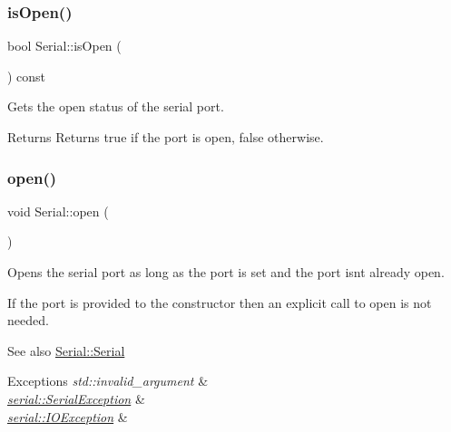 \subsubsection{\texorpdfstring{is\+Open()}{isOpen()}}
{\footnotesize\ttfamily bool Serial\+::is\+Open (\begin{DoxyParamCaption}{ }\end{DoxyParamCaption}) const}

Gets the open status of the serial port.

\begin{DoxyReturn}{Returns}
Returns true if the port is open, false otherwise. 
\end{DoxyReturn}
\mbox{\label{classserial_1_1_serial_af3644ed1a9d899b70e9d63bb9b808d62}} 
\subsubsection{\texorpdfstring{open()}{open()}}
{\footnotesize\ttfamily void Serial\+::open (\begin{DoxyParamCaption}{ }\end{DoxyParamCaption})}

Opens the serial port as long as the port is set and the port isn\textquotesingle{}t already open.

If the port is provided to the constructor then an explicit call to open is not needed.

\begin{DoxySeeAlso}{See also}
\mbox{\hyperlink{classserial_1_1_serial_aecbc4cc1723143805ae5a4aa79ba9332}{Serial\+::\+Serial}}
\end{DoxySeeAlso}

\begin{DoxyExceptions}{Exceptions}
{\em std\+::invalid\+\_\+argument} & \\
\hline
{\em \mbox{\hyperlink{classserial_1_1_serial_exception}{serial\+::\+Serial\+Exception}}} & \\
\hline
{\em \mbox{\hyperlink{classserial_1_1_i_o_exception}{serial\+::\+I\+O\+Exception}}} & \\
\hline
\end{DoxyExceptions}
\mbox{\label{classserial_1_1_serial_a0261dbfb9361784ecb3eee98b85fa103}} 
